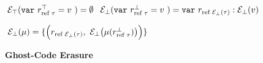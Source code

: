 \begin{figure}[H]
\begin{dfn}
$\phantom{.}\\ \mathcal{E}_{\top}(\mathtt{var}~r^{\top}_{\text{ref }\tau}= v~)
= \emptyset $ 
$\phantom{.}\\ \mathcal{E}_{\bot}(\mathtt{var}~r^{\bot}_{\text{ref }\tau}= v~)
= \mathtt{var}~r_{\text{ref }\mathcal{E}_{\bot}(\tau)}: \mathcal{E}_{\bot}(v) $ \\
\end{dfn}

\begin{dfn}
$\phantom{.}\\
\mathcal{E}_{\bot}(\mu) 
= \{\Big(r_{\text{ref } \mathcal{E}_{\bot}(\tau)},~
		 \mathcal{E}_{\bot}
		 	\big(\mu(r^{\bot}_{\text{ref } \tau})
		 	\big)\Big)\}$ \\
\end{dfn}
\caption{ \textbf{\gml Ghost-Code Erasure}}
\hrulefill
\end{figure}
\newpage
%
%
%
% 
%
% 

							   
% 	   
%	
%  
%   	
%         
%    


%
%



